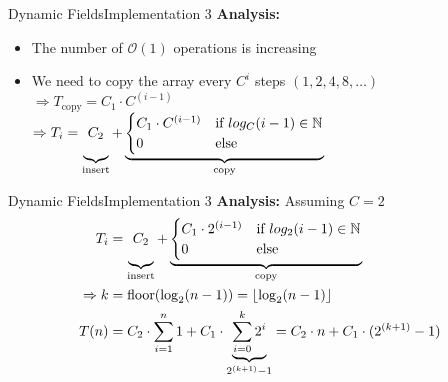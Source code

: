 
\begin{frame}{Dynamic Fields}{Implementation 3}
  \textbf{Analysis:}
  \begin{itemize}
    \item
      The number of $\mathcal{O}(1)$ operations is increasing
    \item
      We need to copy the array every $C^i$ steps $(1, 2, 4, 8,\dots)$\\[0.5em]
      $\Rightarrow T_\text{copy} = C_1 \cdot C^{(i-1)}$\\
      $\Rightarrow T_i
        = \underbrace{
            C_2\vphantom{\begin{cases}C_1\\0\end{cases}}
          }_\text{insert}
          + \underbrace{\begin{cases}
            C_1 \cdot C^{(i-1)} & \text{if } log_C(i-1) \in \mathbb{N}\\
            0 & \text{else}
          \end{cases}}_\text{copy}$
  \end{itemize}
\end{frame}


\begin{frame}{Dynamic Fields}{Implementation 3}
  \textbf{Analysis:}
  Assuming $C = 2$
  \begin{align*}
    T_i
      &= \underbrace{
        C_2\vphantom{\begin{cases}C_1\\0\end{cases}}
      }_\text{insert}
      + \underbrace{\begin{cases}
        C_1 \cdot 2^{(i-1)} & \text{if } log_2(i-1) \in \mathbb{N}\\
        0 & \text{else}
        \end{cases}}_\text{copy}\\
    \Rightarrow k &= \mathrm{floor}(\log_2(n-1))
      = \left\lfloor\log_2(n-1)\right\rfloor\\
    T(n) &= C_2 \cdot \sum_{i=1}^{n} 1
        + C_1 \cdot \underbrace{\sum_{i=0}^{k} 2^i}_{2^{(k+1)}-1}
      = C_2 \cdot n + C_1 \cdot (2^{(k+1)}-1)
  \end{align*}
\end{frame}

